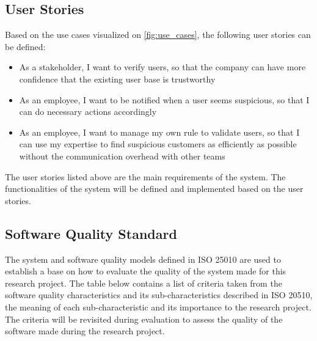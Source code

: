   \subsection{User Stories}
    \label{user_stories}

    Based on the use cases visualized on \autoref{fig:use_cases}, the following user stories can be defined:

    \begin{itemize}
     \item As a stakeholder, I want to verify users, so that the company can have more confidence that the existing user base is trustworthy 
     \item As an employee, I want to be notified when a user seems suspicious, so that I can do necessary actions accordingly
     \item As an employee, I want to manage my own rule to validate users, so that I can use my expertise to find suspicious customers as efficiently as possible without the communication overhead with other teams
    \end{itemize}

    The user stories listed above are the main requirements of the system. The functionalities of the system will be defined and implemented based on the user stories.
    
  \subsection{Software Quality Standard}
    \label{criteria}

    The system and software quality models defined in ISO 25010 \autocite{iso-2011} are used to establish a base on how to evaluate the quality of the system made for this research project. The table below contains a list of criteria taken from the software quality characteristics and its sub-characteristics described in ISO 20510, the meaning of each sub-characteristic and its importance to the research project. The criteria will be revisited during evaluation to assess the quality of the software made during the research project. 

